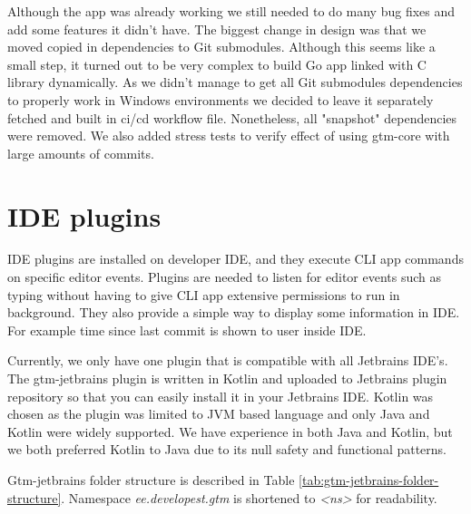 Although the app was already working we still needed to do many bug fixes and add some features it didn't have.
The biggest change in design was that we moved copied in dependencies to Git submodules.
Although this seems like a small step, it turned out to be very complex to build Go app linked with C library dynamically.
As we didn't manage to get all Git submodules dependencies to properly work in Windows environments
we decided to leave it separately fetched and built in ci/cd workflow file.
Nonetheless, all "snapshot" dependencies were removed.
We also added stress tests to verify effect of using gtm-core with large amounts of commits.

\section{IDE plugins}\label{sec:ide-plugins}
IDE plugins are installed on developer IDE, and they execute CLI app commands on specific editor events.
Plugins are needed to listen for editor events such as typing without having to give CLI app extensive permissions to run in background.
They also provide a simple way to display some information in IDE.
For example time since last commit is shown to user inside IDE.

Currently, we only have one plugin that is compatible with all Jetbrains IDE's.
The gtm-jetbrains plugin is written in Kotlin and uploaded to Jetbrains plugin repository so that you can easily install it in your Jetbrains IDE.
Kotlin was chosen as the plugin was limited to JVM based language and only Java and Kotlin were widely supported.
We have experience in both Java and Kotlin, but we both preferred Kotlin to Java due to its null safety and functional patterns.

Gtm-jetbrains folder structure is described in Table
\ref{tab:gtm-jetbrains-folder-structure}.
Namespace \textit{ee.developest.gtm} is shortened to \textit{<ns>} for readability.

